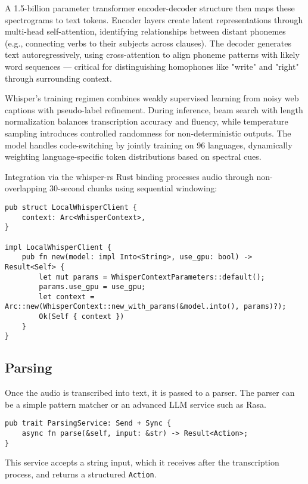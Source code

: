 A 1.5-billion parameter transformer encoder-decoder structure then maps these
spectrograms to text tokens. Encoder layers create latent representations through
multi-head self-attention, identifying relationships between distant phonemes
(e.g., connecting verbs to their subjects across clauses). The decoder generates
text autoregressively, using cross-attention to align phoneme patterns with
likely word sequences --- critical for distinguishing homophones like "write" and "right"
through surrounding context.

Whisper's training regimen combines weakly supervised learning from noisy web captions
with pseudo-label refinement. During inference, beam search with length normalization
balances transcription accuracy and fluency, while temperature sampling introduces
controlled randomness for non-deterministic outputs. The model handles code-switching
by jointly training on 96 languages, dynamically weighting language-specific token
distributions based on spectral cues.

Integration via the whisper-rs Rust binding processes audio through non-overlapping
30-second chunks using sequential windowing:

\begin{verbatim}
pub struct LocalWhisperClient {
    context: Arc<WhisperContext>,
}

impl LocalWhisperClient {
    pub fn new(model: impl Into<String>, use_gpu: bool) -> Result<Self> {
        let mut params = WhisperContextParameters::default();
        params.use_gpu = use_gpu;
        let context = Arc::new(WhisperContext::new_with_params(&model.into(), params)?);
        Ok(Self { context })
    }
}
\end{verbatim}

\subsection{Parsing}
Once the audio is transcribed into text, it is passed to a parser.
The parser can be a simple pattern matcher or an advanced LLM service such as Rasa.

\begin{verbatim}
pub trait ParsingService: Send + Sync {
    async fn parse(&self, input: &str) -> Result<Action>;
}
\end{verbatim}

This service accepts a string input, which it receives after the transcription process, and returns a structured \texttt{Action}.

